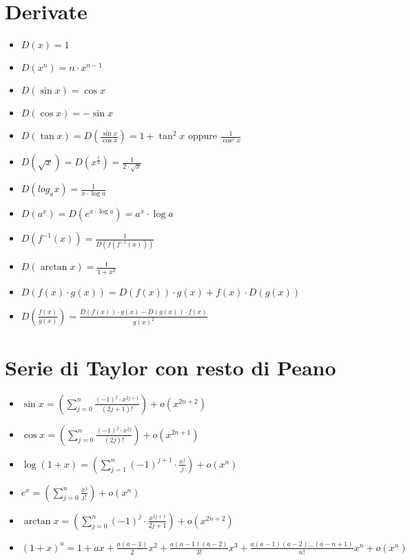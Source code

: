 \documentclass{article}
\begin{document}
\section{Derivate}

\begin{itemize}
    \item $D(x) = 1$
    \item $D(x^n) = n \cdot x^{n - 1}$
    \item $D(\sin x) = \cos x$
    \item $D(\cos x) = - \sin x$
    \item $D(\tan x) = D(\frac{\sin x}{\cos x}) = 1 + \tan^2 x$ oppure $\frac{1}{\cos^2 x}$
    \item $D(\sqrt{x}) = D(x^{\frac{1}{2}}) = \frac{1}{2 \cdot \sqrt{x}}$
    \item $D(log_ax) = \frac{1}{x \cdot \log a}$
    \item $D(a^x) = D(e^{x \cdot \log a}) = a^x \cdot \log a$
    \item $D(f^{-1}(x)) = \frac{1}{D(f(f^{-1}(x)))}$
    \item $D(\arctan x) = \frac{1}{1 + x^2}$
    \item $D(f(x) \cdot g(x)) = D(f(x)) \cdot g(x) + f(x) \cdot D(g(x))$
    \item $D(\frac{f(x)}{g(x)}) = \frac{D(f(x)) \cdot g(x) - D(g(x)) \cdot f(x)}{g(x)^2}$
\end{itemize}

\section{Serie di Taylor con resto di Peano}

\begin{itemize}
    \item $\displaystyle \sin x = (\sum_{j=0}^{n} \frac{(-1)^j \cdot x^{2j + 1}}{(2j + 1)!}) + o(x^{2n + 2})$
    \item $\displaystyle \cos x = (\sum_{j=0}^{n} \frac{(-1)^j \cdot x^{2j}}{(2j)!}) + o(x^{2n + 1})$
    \item $\displaystyle \log(1 + x) = (\sum_{j=1}^{n} (-1)^{j+1} \cdot \frac{x^j}{j}) + o(x^n)$
    \item $\displaystyle e^x = (\sum_{j = 0}^{n} \frac{x^j}{j!}) + o(x^n)$
    \item $\displaystyle \arctan x = (\sum_{j=0}^{n} (-1)^j \cdot \frac{x^{2j + 1}}{2j + 1}) + o(x^{2n + 2})$
    \item $\displaystyle (1 + x)^a = 1 + ax + \frac{a(a - 1)}{2}x^2 + \frac{a(a - 1)(a - 2)}{3!}x^3 + \frac{a(a - 1)(a - 2) \dots (a - n + 1)}{n!}x^n + o(x^n)$
\end{itemize}
\end{document}
